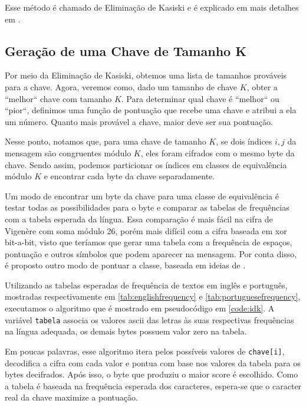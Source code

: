\documentclass[conference]{IEEEtran}
\begin{document}
Esse método é chamado de Eliminação de Kasiski e é explicado em mais detalhes em
\cite{kasiski}.

\subsection{Geração de uma Chave de Tamanho K}
\label{sec:pontuacao}
Por meio da Eliminação de Kasiski, obtemos uma lista de tamanhos prováveis para
a chave. Agora, veremos como, dado um tamanho de chave $K$, obter a ``melhor``
chave com tamanho $K$. Para determinar qual chave é ``melhor`` ou ``pior``,
definimos uma função de pontuação que recebe uma chave e atribui a ela um
número. Quanto mais provável a chave, maior deve ser sua pontuação. 

Nesse ponto, notamos que, para uma chave de tamanho $K$, se dois índices $i, j$ da
mensagem são congruentes módulo $K$, eles foram cifrados com o mesmo byte da
chave. Sendo assim, podemos particionar os índices em classes de equivalência
módulo $K$ e encontrar cada byte da chave separadamente.

Um modo de encontrar um byte da chave para uma classe de equivalência é testar
todas as possibilidades para o byte e comparar as tabelas de frequências com a tabela
esperada da língua. Essa comparação é mais fácil na cifra de Vigenère com soma
módulo 26, porém mais difícil com a cifra baseada em xor bit-a-bit, visto que
teríamos que gerar uma tabela com a frequência de espaços, pontuação e outros
símbolos que podem aparecer na mensagem. Por conta disso, é proposto outro modo
de pontuar a classe, baseada em ideias de \cite{breaking-the-cipher}.

Utilizando as tabelas esperadas de frequência de textos em inglês e português,
mostradas respectivamente em \ref{tab:englishfrequency} e
\ref{tab:portuguesefrequency}, executamos o algoritmo que é mostrado em
pseudocódigo em \ref{code:idk}. A variável \verb|tabela| associa os valores
ascii das letras às suas respectivas frequências na língua adequada, os demais
bytes possuem valor zero na tabela.

Em poucas palavras, esse algoritmo itera pelos possíveis valores de
\verb|chave[i]|, decodifica a cifra com cada valor e pontua com base nos valores
da tabela para os bytes decifrados. Após isso, o byte que produziu o maior score
é escolhido. Como a tabela é baseada na frequência esperada dos caracteres,
espera-se que o caracter real da chave maximize a pontuação.
\end{document}
